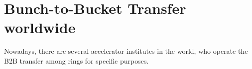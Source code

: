%
\section{Bunch-to-Bucket Transfer worldwide}
Nowadays, there are several accelerator institutes in the world, who operate the B2B transfer among rings for specific purposes. 

